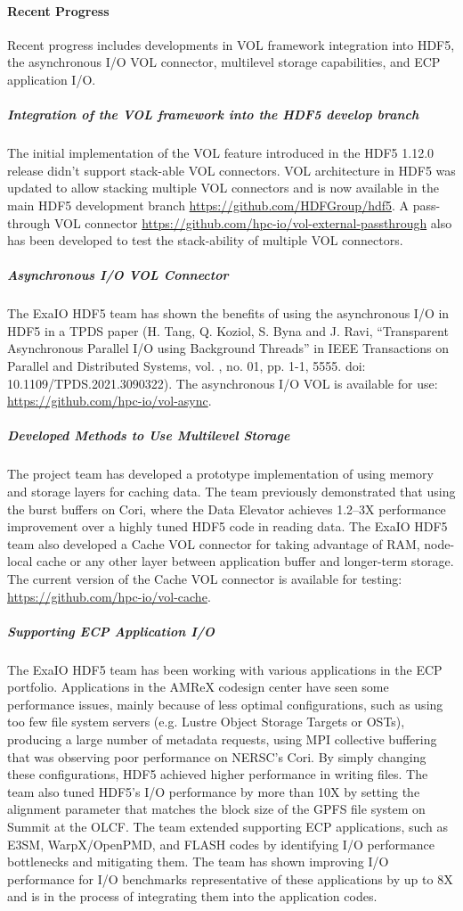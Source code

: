 \paragraph{Recent Progress}
Recent progress includes developments in VOL framework integration into HDF5, the asynchronous I/O VOL connector, multilevel storage capabilities, and ECP application I/O.

\subparagraph{Integration of the VOL framework into the HDF5 develop branch} The initial implementation of the VOL feature introduced in the HDF5 1.12.0 release didn't support stack-able VOL connectors. VOL architecture in HDF5 was updated to allow stacking multiple VOL connectors and is now available in the main HDF5 development branch \url{https://github.com/HDFGroup/hdf5}. A pass-through VOL connector \url{https://github.com/hpc-io/vol-external-passthrough} also has been developed to test the stack-ability of multiple VOL connectors. 

\subparagraph{Asynchronous I/O VOL Connector}  The ExaIO HDF5 team has shown the benefits of using the asynchronous I/O in HDF5 in a TPDS paper (H. Tang, Q. Koziol, S. Byna and J. Ravi, ``Transparent Asynchronous Parallel I/O using Background Threads'' in IEEE Transactions on Parallel and Distributed Systems, vol. , no. 01, pp. 1-1, 5555.
doi: 10.1109/TPDS.2021.3090322). The asynchronous I/O VOL is available for use: \url{https://github.com/hpc-io/vol-async}.

\subparagraph{Developed Methods to Use Multilevel Storage} The project team has developed a prototype implementation of using memory and storage layers for caching data. The team previously demonstrated that using the burst buffers on Cori, where the Data Elevator achieves 1.2--3X performance improvement over a highly tuned HDF5 code in reading data. The ExaIO HDF5 team also developed a Cache VOL connector for taking advantage of RAM, node-local cache or any other layer between application buffer and longer-term storage. The current version of the Cache VOL connector is available for testing: \url{https://github.com/hpc-io/vol-cache}.  

\subparagraph{Supporting ECP Application I/O}
The ExaIO HDF5 team has been working with various applications in the ECP portfolio. Applications in the AMReX codesign center have seen some performance issues, mainly because of less optimal configurations, such as using too few file system servers (e.g. Lustre Object Storage Targets or OSTs), producing a large number of metadata requests, using MPI collective buffering that was observing poor performance on NERSC's Cori. By simply changing these configurations, HDF5 achieved higher performance in writing files. The team also tuned HDF5's I/O performance by more than 10X by setting the alignment parameter that matches the block size of the GPFS file system on Summit at the OLCF. The team extended supporting ECP applications, such as E3SM, WarpX/OpenPMD, and FLASH codes by identifying I/O performance bottlenecks and mitigating them. The team has shown improving I/O performance for I/O benchmarks representative of these applications by up to 8X and is in the process of integrating them into the application codes.

